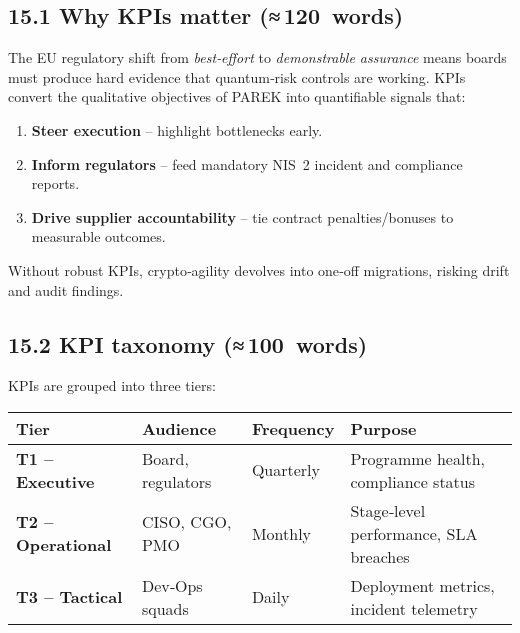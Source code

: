 \documentclass[
  english,
]{article}
\providecommand{\tightlist}{%
  \setlength{\itemsep}{0pt}\setlength{\parskip}{0pt}}
\begin{document}
\subsection{15.1 Why KPIs matter
(≈\,120~words)}\label{why-kpis-matter-120-words}

The EU regulatory shift from \emph{best‑effort} to \emph{demonstrable
assurance} means boards must produce hard evidence that quantum‑risk
controls are working. KPIs convert the qualitative objectives of PAREK
into quantifiable signals that:

\begin{enumerate}
\def\labelenumi{\arabic{enumi}.}
\tightlist
\item
  \textbf{Steer execution} -- highlight bottlenecks early.
\item
  \textbf{Inform regulators} -- feed mandatory NIS~2 incident and
  compliance reports.
\item
  \textbf{Drive supplier accountability} -- tie contract
  penalties/bonuses to measurable outcomes.
\end{enumerate}

Without robust KPIs, crypto‑agility devolves into one‑off migrations,
risking drift and audit findings.

\subsection{15.2 KPI taxonomy
(≈\,100~words)}\label{kpi-taxonomy-100-words}

KPIs are grouped into three tiers:

\begin{longtable}[]{@{}
  >{\raggedright\arraybackslash}p{}
  >{\raggedright\arraybackslash}p{}
  >{\raggedright\arraybackslash}p{}
  >{\raggedright\arraybackslash}p{}@{}}
\toprule\noalign{}
\begin{minipage}[b]{\linewidth}\raggedright
Tier
\end{minipage} & \begin{minipage}[b]{\linewidth}\raggedright
Audience
\end{minipage} & \begin{minipage}[b]{\linewidth}\raggedright
Frequency
\end{minipage} & \begin{minipage}[b]{\linewidth}\raggedright
Purpose
\end{minipage} \\
\midrule\noalign{}
\endhead
\bottomrule\noalign{}
\endlastfoot
\textbf{T1 -- Executive} & Board, regulators & Quarterly & Programme
health, compliance status \\
\textbf{T2 -- Operational} & CISO, CGO, PMO & Monthly & Stage‑level
performance, SLA breaches \\
\textbf{T3 -- Tactical} & Dev‑Ops squads & Daily & Deployment metrics,
incident telemetry \\
\end{longtable}
\end{document}
